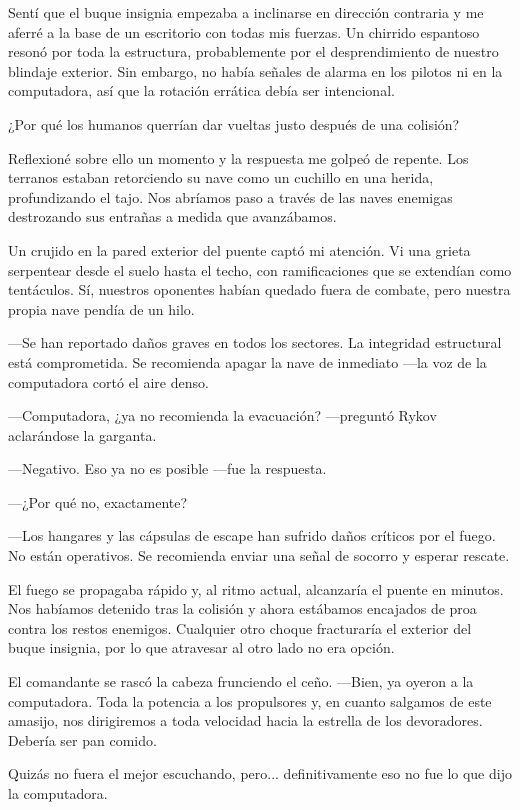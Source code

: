 Sentí que el buque insignia empezaba a inclinarse en dirección contraria y me aferré a la base de un escritorio con todas mis fuerzas. Un chirrido espantoso resonó por toda la estructura, probablemente por el desprendimiento de nuestro blindaje exterior. Sin embargo, no había señales de alarma en los pilotos ni en la computadora, así que la rotación errática debía ser intencional.

¿Por qué los humanos querrían dar vueltas justo después de una colisión?

Reflexioné sobre ello un momento y la respuesta me golpeó de repente. Los terranos estaban retorciendo su nave como un cuchillo en una herida, profundizando el tajo. Nos abríamos paso a través de las naves enemigas destrozando sus entrañas a medida que avanzábamos.

Un crujido en la pared exterior del puente captó mi atención. Vi una grieta serpentear desde el suelo hasta el techo, con ramificaciones que se extendían como tentáculos. Sí, nuestros oponentes habían quedado fuera de combate, pero nuestra propia nave pendía de un hilo.

—Se han reportado daños graves en todos los sectores. La integridad estructural está comprometida. Se recomienda apagar la nave de inmediato —la voz de la computadora cortó el aire denso.

—Computadora, ¿ya no recomienda la evacuación? —preguntó Rykov aclarándose la garganta.

—Negativo. Eso ya no es posible —fue la respuesta.

 —¿Por qué no, exactamente?

—Los hangares y las cápsulas de escape han sufrido daños críticos por el fuego. No están operativos. Se recomienda enviar una señal de socorro y esperar rescate.

El fuego se propagaba rápido y, al ritmo actual, alcanzaría el puente en minutos. Nos habíamos detenido tras la colisión y ahora estábamos encajados de proa contra los restos enemigos. Cualquier otro choque fracturaría el exterior del buque insignia, por lo que atravesar al otro lado no era opción.

El comandante se rascó la cabeza frunciendo el ceño. —Bien, ya oyeron a la computadora. Toda la potencia a los propulsores y, en cuanto salgamos de este amasijo, nos dirigiremos a toda velocidad hacia la estrella de los devoradores. Debería ser pan comido.

Quizás no fuera el mejor escuchando, pero... definitivamente eso no fue lo que dijo la computadora.

